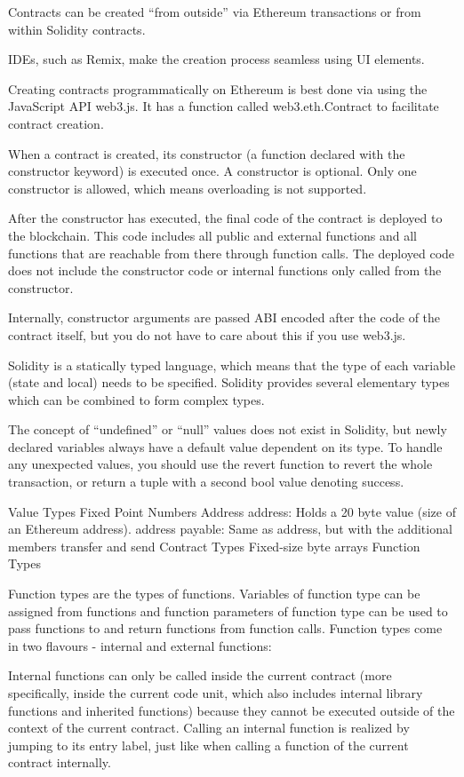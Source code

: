\documentclass[a4paper]{article}
\begin{document}
Contracts can be created “from outside” via Ethereum transactions or from within Solidity contracts.

IDEs, such as Remix, make the creation process seamless using UI elements.

Creating contracts programmatically on Ethereum is best done via using the JavaScript API web3.js. It has a function called web3.eth.Contract to facilitate contract creation.

When a contract is created, its constructor (a function declared with the constructor keyword) is executed once.
A constructor is optional. Only one constructor is allowed, which means overloading is not supported.

After the constructor has executed, the final code of the contract is deployed to the blockchain. This code includes all public and external functions and all functions that are reachable from there through function calls. The deployed code does not include the constructor code or internal functions only called from the constructor.

Internally, constructor arguments are passed ABI encoded after the code of the contract itself, but you do not have to care about this if you use web3.js\cite{web3_api}.

Solidity is a statically typed language, which means that the type of each variable (state and local) needs to be specified. Solidity provides several elementary types which can be combined to form complex types.

The concept of “undefined” or “null” values does not exist in Solidity, but newly declared variables always have a default value dependent on its type. To handle any unexpected values, you should use the revert function to revert the whole transaction, or return a tuple with a second bool value denoting success.

Value Types
Fixed Point Numbers
Address address: Holds a 20 byte value (size of an Ethereum address).
address payable: Same as address, but with the additional members transfer and send
Contract Types
Fixed-size byte arrays
Function Types

Function types are the types of functions. Variables of function type can be assigned from functions and function parameters of function type can be used to pass functions to and return functions from function calls. Function types come in two flavours - internal and external functions:

Internal functions can only be called inside the current contract (more specifically, inside the current code unit, which also includes internal library functions and inherited functions) because they cannot be executed outside of the context of the current contract. Calling an internal function is realized by jumping to its entry label, just like when calling a function of the current contract internally.
\end{document}

